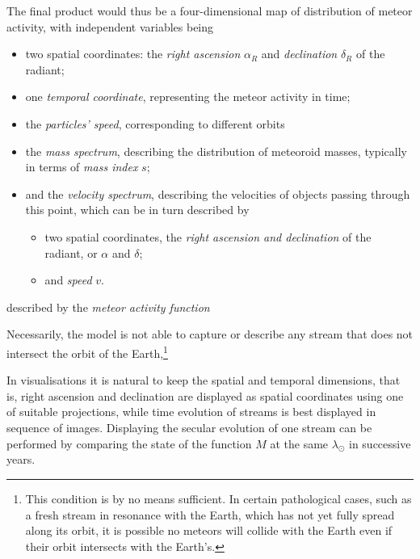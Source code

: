     The final product would thus be a four-dimensional map of distribution of meteor activity, with independent variables being
    \begin{itemize}
        \item two spatial coordinates: the \emph{right ascension} $\alpha_R$ and \emph{declination} $\delta_R$ of the radiant;
        \item one \emph{temporal coordinate}, representing the meteor activity in time;
        \item the \emph{particles' speed}, corresponding to different orbits
        \item the \emph{mass spectrum}, describing the distribution of meteoroid masses, typically in terms of \textit{mass index} $s$;
        \item and the \emph{velocity spectrum}, describing the velocities of objects passing through this point, which can be in turn described by
            \begin{itemize}
                \item two spatial coordinates, the \emph{right ascension and declination} of the radiant, or $\alpha$ and $\delta$;
                \item and \emph{speed} $v$.
            \end{itemize}
    \end{itemize}

    described by the \emph{meteor activity function}

    Necessarily, the model is not able to capture or describe any stream that does not intersect the orbit of the
    Earth,\footnote{This condition is by no means sufficient. In certain pathological cases, such as a fresh stream in resonance
    with the Earth, which has not yet fully spread along its orbit, it is possible no meteors will collide with the Earth even
    if their orbit intersects with the Earth's.}

    In visualisations it is natural to keep the spatial and temporal dimensions, that is, right ascension and declination are
    displayed as spatial coordinates using one of suitable projections, while time evolution of streams is best displayed
    in sequence of images.
    Displaying the secular evolution of one stream can be performed by comparing the state of the function $M$ at
    the same $\lambda_\odot$ in successive years.

    \citep{balaz+2020}

